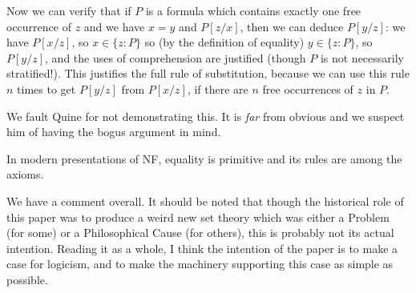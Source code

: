 \documentclass[12pt]{article}
\begin{document}
Now we can verify that if $P$ is a formula which contains exactly one free occurrence of $z$ and we have $x=y$ and $P[z/x]$, then we can deduce $P[y/z]$:  we 
 have $P[x/z]$, so $x \in \{z:P\}$ so (by the definition of equality) $y \in \{z:P\}$, so $P[y/z]$, and the uses of comprehension are justified (though $P$ is not necessarily stratified!).  This justifies the full rule of substitution, because we
can use this rule $n$ times to get $P[y/z]$ from $P[x/z]$, if there are $n$ free occurrences of $z$ in $P$.

We fault Quine for not demonstrating this.  It is {\em far\/} from obvious and we suspect him of having the bogus argument in mind.

In modern presentations of NF, equality is primitive and its rules are among the axioms.

We have a comment overall.  It should be noted that though the historical role of this paper was to produce a weird new set theory which was either a Problem (for some) or a Philosophical Cause (for others), this is probably not its actual intention.  Reading it as a whole, I think the intention of the paper is to make a case for logicism, and to make the machinery supporting this case as simple as possible.
\end{document}
